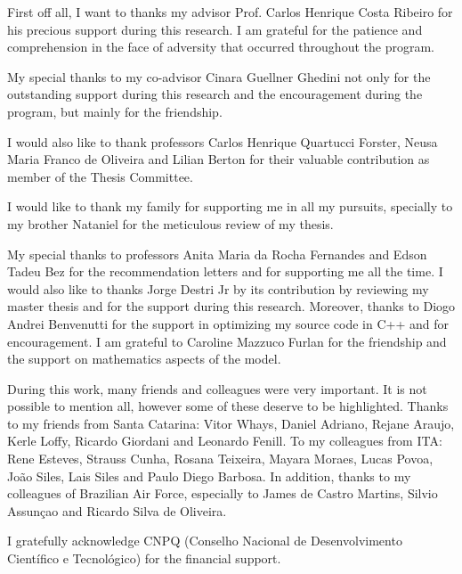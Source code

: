 First off all, I want to thanks my advisor Prof. Carlos Henrique Costa Ribeiro for his precious support during this research. I am grateful for the patience and comprehension in the face of adversity that occurred throughout the program.

My special thanks to my co-advisor Cinara Guellner Ghedini not only for the outstanding support during this research and the encouragement during the program, but mainly for the friendship. 

I would also like to thank professors Carlos Henrique Quartucci Forster, Neusa Maria Franco de Oliveira and Lilian Berton for their valuable contribution as member of the Thesis Committee.

I would like to thank my family for supporting me in all my pursuits, specially to my brother Nataniel for the meticulous review of my thesis.

My special thanks to professors Anita Maria da Rocha Fernandes and Edson Tadeu Bez for the recommendation letters and for supporting me all the time. I would also like to thanks Jorge Destri Jr by its contribution by reviewing my master thesis and for the support during this research. Moreover, thanks to Diogo Andrei Benvenutti for the support in optimizing my source code in C++ and for encouragement. I am grateful to Caroline Mazzuco Furlan for the friendship and the support on mathematics aspects of the model. 

During this work, many friends and colleagues were very important. It is not possible to mention all, however some of these deserve to be highlighted. Thanks to my friends from Santa Catarina: Vitor Whays, Daniel Adriano, Rejane Araujo, Kerle Loffy, Ricardo Giordani and Leonardo Fenill. To my colleagues from ITA: Rene Esteves, Strauss Cunha, Rosana Teixeira, Mayara Moraes, Lucas Povoa, Jo{\~a}o Siles, Lais Siles and Paulo Diego Barbosa. In addition, thanks to my colleagues of Brazilian Air Force, especially to James de Castro Martins, Silvio Assun\c{c}ao and Ricardo Silva de Oliveira. 

I gratefully acknowledge CNPQ (Conselho Nacional de Desenvolvimento Cient{\'i}fico e Tecnol{\'o}gico) for the financial support.